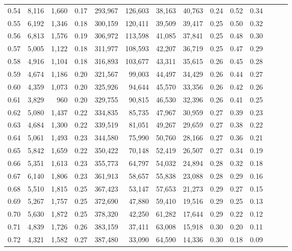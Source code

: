 \begin{tabular}{rrrrrrrrrrrrrr}
0.54 &  8,116 &  1,660 &  0.17 &  293,967 &  126,603 &  38,163 &  40,763 &  0.24 &  0.52 &      0.34 \\
0.55 &  6,192 &  1,346 &  0.18 &  300,159 &  120,411 &  39,509 &  39,417 &  0.25 &  0.50 &      0.32 \\
0.56 &  6,813 &  1,576 &  0.19 &  306,972 &  113,598 &  41,085 &  37,841 &  0.25 &  0.48 &      0.30 \\
0.57 &  5,005 &  1,122 &  0.18 &  311,977 &  108,593 &  42,207 &  36,719 &  0.25 &  0.47 &      0.29 \\
0.58 &  4,916 &  1,104 &  0.18 &  316,893 &  103,677 &  43,311 &  35,615 &  0.26 &  0.45 &      0.28 \\
0.59 &  4,674 &  1,186 &  0.20 &  321,567 &   99,003 &  44,497 &  34,429 &  0.26 &  0.44 &      0.27 \\
0.60 &  4,359 &  1,073 &  0.20 &  325,926 &   94,644 &  45,570 &  33,356 &  0.26 &  0.42 &      0.26 \\
0.61 &  3,829 &    960 &  0.20 &  329,755 &   90,815 &  46,530 &  32,396 &  0.26 &  0.41 &      0.25 \\
0.62 &  5,080 &  1,437 &  0.22 &  334,835 &   85,735 &  47,967 &  30,959 &  0.27 &  0.39 &      0.23 \\
0.63 &  4,684 &  1,300 &  0.22 &  339,519 &   81,051 &  49,267 &  29,659 &  0.27 &  0.38 &      0.22 \\
0.64 &  5,061 &  1,493 &  0.23 &  344,580 &   75,990 &  50,760 &  28,166 &  0.27 &  0.36 &      0.21 \\
0.65 &  5,842 &  1,659 &  0.22 &  350,422 &   70,148 &  52,419 &  26,507 &  0.27 &  0.34 &      0.19 \\
0.66 &  5,351 &  1,613 &  0.23 &  355,773 &   64,797 &  54,032 &  24,894 &  0.28 &  0.32 &      0.18 \\
0.67 &  6,140 &  1,806 &  0.23 &  361,913 &   58,657 &  55,838 &  23,088 &  0.28 &  0.29 &      0.16 \\
0.68 &  5,510 &  1,815 &  0.25 &  367,423 &   53,147 &  57,653 &  21,273 &  0.29 &  0.27 &      0.15 \\
0.69 &  5,267 &  1,757 &  0.25 &  372,690 &   47,880 &  59,410 &  19,516 &  0.29 &  0.25 &      0.13 \\
0.70 &  5,630 &  1,872 &  0.25 &  378,320 &   42,250 &  61,282 &  17,644 &  0.29 &  0.22 &      0.12 \\
0.71 &  4,839 &  1,726 &  0.26 &  383,159 &   37,411 &  63,008 &  15,918 &  0.30 &  0.20 &      0.11 \\
0.72 &  4,321 &  1,582 &  0.27 &  387,480 &   33,090 &  64,590 &  14,336 &  0.30 &  0.18 &      0.09 \\

\end{tabular}
